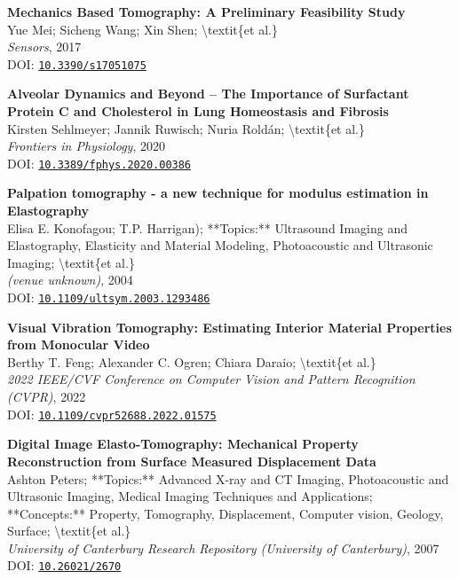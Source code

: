 \documentclass[11pt,a4paper]{article}
\begin{document}
\begin{enumerate}[leftmargin=*, label=\textbf{[\arabic*]}, itemsep=10pt]
\item 
\textbf{Mechanics Based Tomography: A Preliminary Feasibility Study}
\\
Yue Mei; Sicheng Wang; Xin Shen; \textbackslash{}textit\{et al.\}
\\
\textit{Sensors}, 2017
\\
DOI: \href{https://doi.org/10.3390/s17051075}{\texttt{10.3390/s17051075}}

\item 
\textbf{Alveolar Dynamics and Beyond – The Importance of Surfactant Protein C and Cholesterol in Lung Homeostasis and Fibrosis}
\\
Kirsten Sehlmeyer; Jannik Ruwisch; Nuria Roldán; \textbackslash{}textit\{et al.\}
\\
\textit{Frontiers in Physiology}, 2020
\\
DOI: \href{https://doi.org/10.3389/fphys.2020.00386}{\texttt{10.3389/fphys.2020.00386}}

\item 
\textbf{Palpation tomography - a new technique for modulus estimation in Elastography}
\\
Elisa E. Konofagou; T.P. Harrigan); **Topics:** Ultrasound Imaging and Elastography, Elasticity and Material Modeling, Photoacoustic and Ultrasonic Imaging; \textbackslash{}textit\{et al.\}
\\
\textit{\textit{(venue unknown)}}, 2004
\\
DOI: \href{https://doi.org/10.1109/ultsym.2003.1293486}{\texttt{10.1109/ultsym.2003.1293486}}

\item 
\textbf{Visual Vibration Tomography: Estimating Interior Material Properties from Monocular Video}
\\
Berthy T. Feng; Alexander C. Ogren; Chiara Daraio; \textbackslash{}textit\{et al.\}
\\
\textit{2022 IEEE/CVF Conference on Computer Vision and Pattern Recognition (CVPR)}, 2022
\\
DOI: \href{https://doi.org/10.1109/cvpr52688.2022.01575}{\texttt{10.1109/cvpr52688.2022.01575}}

\item 
\textbf{Digital Image Elasto-Tomography: Mechanical Property Reconstruction from Surface Measured Displacement Data}
\\
Ashton Peters; **Topics:** Advanced X-ray and CT Imaging, Photoacoustic and Ultrasonic Imaging, Medical Imaging Techniques and Applications; **Concepts:** Property, Tomography, Displacement, Computer vision, Geology, Surface; \textbackslash{}textit\{et al.\}
\\
\textit{University of Canterbury Research Repository (University of Canterbury)}, 2007
\\
DOI: \href{https://doi.org/10.26021/2670}{\texttt{10.26021/2670}}


\end{enumerate}
\end{document}
